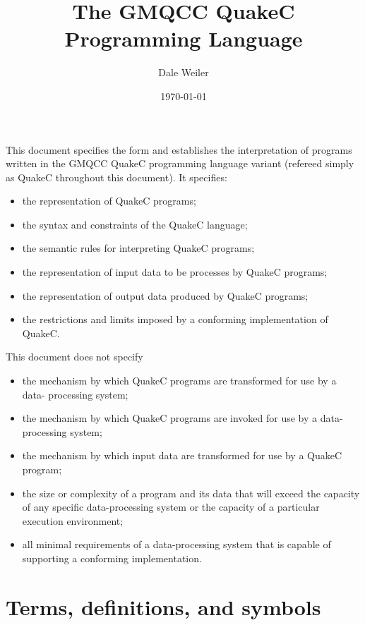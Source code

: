 \documentclass{article}
\title{The GMQCC QuakeC Programming Language}
\author{Dale Weiler}
\date{\today}
\begin{document}
\maketitle
\thispagestyle{empty}
\raggedright
\abstract
This document specifies the form and establishes the interpretation of programs written in
the GMQCC QuakeC programming language variant (refereed simply as QuakeC throughout this
document). It specifies:
\begin{itemize}
	\item the representation of QuakeC programs;
	\item the syntax and constraints of the QuakeC language;
	\item the semantic rules for interpreting QuakeC programs;
	\item the representation of input data to be processes by QuakeC programs;
	\item the representation of output data produced by QuakeC programs;
	\item the restrictions and limits imposed by a conforming implementation of QuakeC.
\end{itemize}
This document does not specify
\begin{itemize}
	\item the mechanism by which QuakeC programs are transformed for use by a data-
	      processing system;
	\item the mechanism by which QuakeC programs are invoked for use by a data-processing
	      system;
	\item the mechanism by which input data are transformed for use by a QuakeC program;
	\item the size or complexity of a program and its data that will exceed the capacity
	      of any specific data-processing system or the capacity of a particular
	      execution environment;
	\item all minimal requirements of a data-processing system that is capable of
	      supporting a conforming implementation.
\end{itemize}

\newpage
\thispagestyle{empty}
\tableofcontents
\newpage

\raggedright %

\section{Terms, definitions, and symbols}
\end{document}
